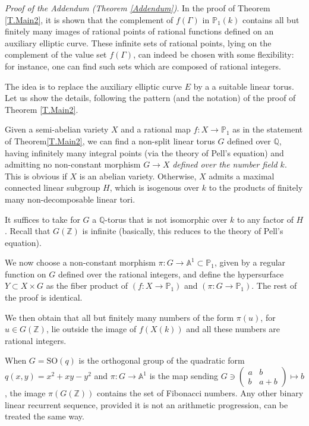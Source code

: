 \documentclass[leqno,12pt]{article} %
\def\A{{{\mathbb A}}}
\def\Z{{{\mathbb Z}}}
\def\Q{{{\mathbb Q}}}
\def\P{{{\mathbb P}}}
\theoremstyle{plain} %
\theoremstyle{definition} %
\begin{document}
\medskip


 {\it Proof of the Addendum (Theorem \ref{Addendum})}.  
In the proof of Theorem \ref{T.Main2}, it is shown that the complement of $f(\Gamma)$ in $\P_1(k)$ contains all but finitely many images of rational points of rational functions defined on an auxiliary elliptic curve.   These infinite sets of rational points, lying on  the complement of the value set $f(\Gamma)$, can indeed be chosen with some  flexibility: for instance, one can find such sets which are composed of rational integers.

The idea is to replace the auxiliary elliptic curve $E$ by a a suitable linear torus. Let us show the details, following the pattern (and the notation) of the proof of Theorem \ref{T.Main2}. 

Given a semi-abelian variety $X$ and a rational map $f:X\to \P_1$ as in the statement of Theorem\ref{T.Main2}, we can find a non-split linear torus $G$ defined over $\Q$, having infinitely many integral points (via the theory of Pell's equation) and admitting no non-constant  morphism  $G\to X$ {\it defined over the number field $k$}. This is obvious if $X$ is an abelian variety. Otherwise, $X$ admits a maximal connected linear subgroup $H$, which is isogenous over $k$ to the products of finitely many non-decomposable linear tori. 

It suffices to take for $G$ a $\Q$-torus that is not isomorphic over $k$ to any factor of $H$. Recall that $G(\Z)$ is infinite (basically, this reduces to   the theory of Pell's equation).

We now choose a non-constant morphism $\pi:G\to \A^1\subset \P_1$, given by a regular function on $G$ defined over the rational integers,  and define the hypersurface $Y\subset X\times G$ as the fiber product of $(f:X\to \P_1)$ and $(\pi:G\to \P_1)$. The rest of the proof is identical.

We then obtain that all but finitely many numbers of the form $\pi(u)$, for $u\in G(\Z)$, lie outside the image of $f(X(k))$ and all these numbers are rational integers.

When $G=\mathrm{SO}(q)$ is the orthogonal group of the quadratic form $q(x,y)=x^2+xy-y^2$ and  $\pi:G\to \A^1$ is the map sending $G\ni \left( \begin{matrix} a&b \\ b&a+b\end{matrix}\right)\mapsto b$, the image $\pi(G(\Z))$ contains the set of Fibonacci numbers.
Any other   binary linear recurrent sequence, provided it is not an arithmetic progression, can be treated the same way.
\end{document}
